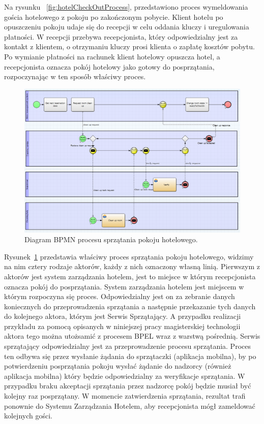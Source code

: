Na rysunku ~\ref{fig:hotelCheckOutProcess}, przedstawiono proces wymeldowania gościa hotelowego z pokoju po zakończonym pobycie. Klient hotelu po opuszczeniu pokoju udaje się do recepcji w celu oddania kluczy i uregulowania płatności. W recepcji przebywa recepcjonista, który odpowiedzialny jest za kontakt z klientem, o otrzymaniu kluczy prosi klienta o zapłatę kosztów pobytu. Po wymianie płatności na rachunek klient hotelowy opuszcza hotel, a recepcjonista oznacza pokój hotelowy jako gotowy do posprzątania, rozpoczynając w ten sposób właściwy proces. 

\begin{figure}[h]
\centerline{\includegraphics[scale=0.4]{roomCleanUpProcess}}
\caption{Diagram BPMN procesu sprzątania pokoju hotelowego.}
\label{fig:roomCleanUpProcess}
\end{figure}

Rysunek~\ref{fig:roomCleanUpProcess} przedstawia właściwy proces sprzątania pokoju hotelowego, widzimy na nim cztery rodzaje aktorów, każdy z nich oznaczony własną linią. Pierwszym z aktorów jest system zarządzania hotelem, jest to miejsce w którym recepcjonista oznacza pokój do posprzątania. System zarządzania hotelem jest miejscem w którym rozpoczyna się proces. Odpowiedzialny jest on za zebranie danych koniecznych do przeprowadzenia sprzątania a następnie przekazanie tych danych do kolejnego aktora, którym jest Serwis Sprzątający. A przypadku realizacji przykładu za pomocą opisanych w niniejszej pracy magisterskiej technologii aktora tego można utożsamić z procesem BPEL wraz z warstwą pośrednią. Serwis sprzątający odpowiedzialny jest za przeprowadzenie procesu sprzątania. Proces ten odbywa się przez wysłanie żądania do sprzątaczki (aplikacja mobilna), by po potwierdzeniu posprzątania pokoju wysłać żądanie do nadzorcy (również aplikacja mobilna) który będzie odpowiedzialny za weryfikacje sprzątania.  W przypadku braku akceptacji sprzątania przez nadzorcę pokój będzie musiał być kolejny raz posprzątany. W momencie zatwierdzenia sprzątania, rezultat trafi ponownie do Systemu Zarządzania Hotelem, aby recepcjonista mógł zameldować kolejnych gości. 

